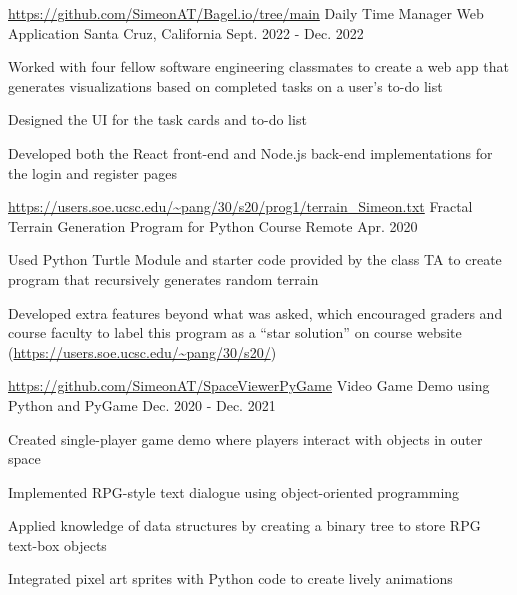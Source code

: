

\begin{cventries}

  \cventry
    {\url{https://github.com/SimeonAT/Bagel.io/tree/main}} %
    {Daily Time Manager Web Application} %
    {Santa Cruz, California} %
    {Sept. 2022 - Dec. 2022} %
    {
      \begin{cvitems} %
        \item { Worked with four fellow software engineering classmates to create a web app that generates
                visualizations based on completed tasks on a user’s to-do list}
        \item {Designed the UI for the task cards and to-do list}
        \item {Developed both the React front-end and Node.js back-end implementations for the login and register
               pages}
      \end{cvitems}
    }

    \cventry
    {\url{https://users.soe.ucsc.edu/~pang/30/s20/prog1/terrain_Simeon.txt}} %
    {Fractal Terrain Generation Program for Python Course} %
    {Remote} %
    {Apr. 2020} %
    {
      \begin{cvitems} %
        \item {Used Python Turtle Module and starter code provided by the class TA to create program that
               recursively generates random terrain}
        \item {Developed extra features beyond what was asked, which encouraged graders and course faculty
               to label this program as a “star solution” on course website (\url{https://users.soe.ucsc.edu/~pang/30/s20/})}
      \end{cvitems}
    }

    \cventry
    {\url{https://github.com/SimeonAT/SpaceViewerPyGame}} %
    {Video Game Demo using Python and PyGame} %
    {} %
    {Dec. 2020 - Dec. 2021} %
    {
      \begin{cvitems} %
        \item {Created single-player game demo where players interact with objects in outer space}
        \item {Implemented RPG-style text dialogue using object-oriented programming}
        \item {Applied knowledge of data structures by creating a binary tree to store RPG text-box objects}
        \item {Integrated pixel art sprites with Python code to create lively animations}
      \end{cvitems}
    }

\end{cventries}
